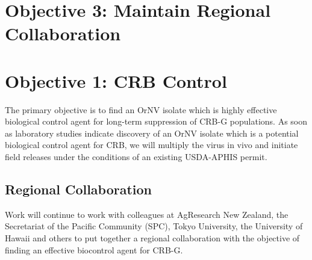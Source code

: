\documentclass[12pt,letterpaper,english,bibliography=totocnumbered,abstract=on]{scrartcl}
\begin{document}
%	
%	

\clearpage
\section{Objective 3: Maintain Regional Collaboration}









\section{Objective 1: CRB Control}

The primary objective is to find an OrNV isolate which is highly effective biological control agent for long-term suppression of CRB-G populations. As soon as laboratory studies indicate discovery of an OrNV isolate which is a potential biological control agent for CRB, we will multiply the virus in vivo and initiate field releases under the conditions of an existing USDA-APHIS permit.

\subsection{Regional Collaboration}

Work will continue to work with colleagues at AgResearch New Zealand, the Secretariat of the Pacific Community (SPC), Tokyo University, the University of Hawaii and others to put together a regional collaboration with the objective of finding an effective biocontrol agent for CRB-G.
\end{document}
